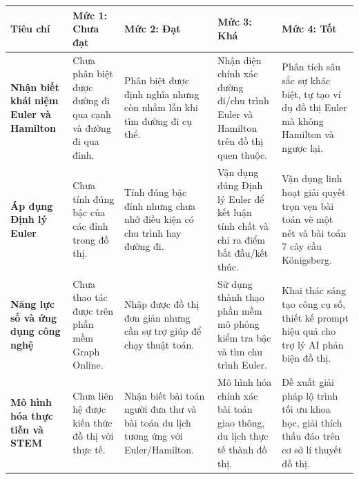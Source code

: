 \documentclass[12pt, a4paper]{article}
\begin{document}
\begin{center}
\begin{tabularx}{\textwidth}{|>{\bfseries}p{3cm}|X|X|X|X|}
\hline
\textbf{Tiêu chí} & \textbf{Mức 1: Chưa đạt} & \textbf{Mức 2: Đạt} & \textbf{Mức 3: Khá} & \textbf{Mức 4: Tốt} \\ \hline
Nhận biết khái niệm Euler và Hamilton & Chưa phân biệt được đường đi qua cạnh và đường đi qua đỉnh. & Phân biệt được định nghĩa nhưng còn nhầm lẫn khi tìm đường đi cụ thể. & Nhận diện chính xác đường đi/chu trình Euler và Hamilton trên đồ thị quen thuộc. & Phân tích sâu sắc sự khác biệt, tự tạo ví dụ đồ thị Euler mà không Hamilton và ngược lại. \\ \hline
Áp dụng Định lý Euler & Chưa tính đúng bậc của các đỉnh trong đồ thị. & Tính đúng bậc đỉnh nhưng chưa nhớ điều kiện có chu trình hay đường đi. & Vận dụng đúng Định lý Euler để kết luận tính chất và chỉ ra điểm bắt đầu/kết thúc. & Vận dụng linh hoạt giải quyết trọn vẹn bài toán vẽ một nét và bài toán 7 cây cầu Königsberg. \\ \hline
Năng lực số và ứng dụng công nghệ & Chưa thao tác được trên phần mềm Graph Online. & Nhập được đồ thị đơn giản nhưng cần sự trợ giúp để chạy thuật toán. & Sử dụng thành thạo phần mềm mô phỏng kiểm tra bậc và tìm chu trình Euler. & Khai thác sáng tạo công cụ số, thiết kế prompt hiệu quả cho trợ lý AI phản biện đồ thị. \\ \hline
Mô hình hóa thực tiễn và STEM & Chưa liên hệ được kiến thức đồ thị với thực tế. & Nhận biết bài toán người đưa thư và bài toán du lịch tương ứng với Euler/Hamilton. & Mô hình hóa chính xác bài toán giao thông, du lịch thực tế thành đồ thị. & Đề xuất giải pháp lộ trình tối ưu khoa học, giải thích thấu đáo trên cơ sở lí thuyết đồ thị. \\ \hline
\end{tabularx}
\end{center}
\end{document}
